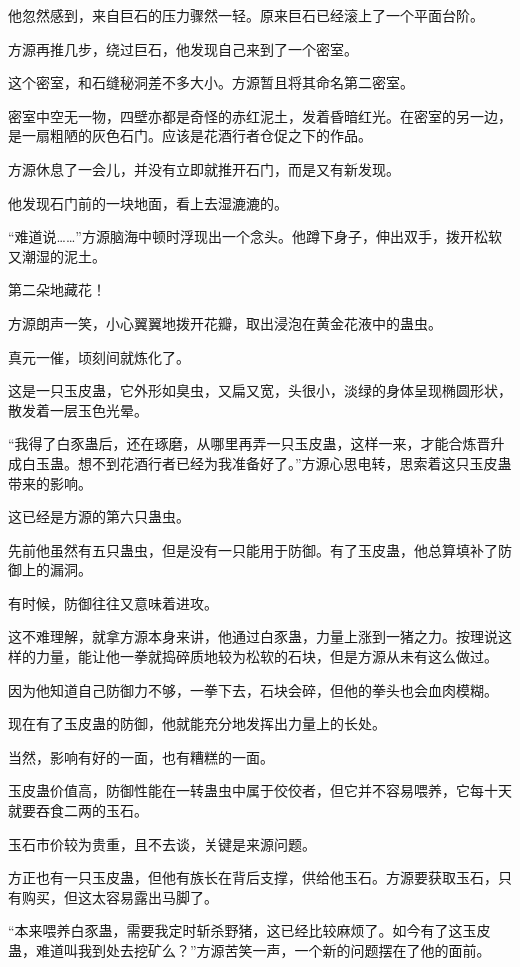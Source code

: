\begin{this_body}
他忽然感到，来自巨石的压力骤然一轻。原来巨石已经滚上了一个平面台阶。

方源再推几步，绕过巨石，他发现自己来到了一个密室。

这个密室，和石缝秘洞差不多大小。方源暂且将其命名第二密室。

密室中空无一物，四壁亦都是奇怪的赤红泥土，发着昏暗红光。在密室的另一边，是一扇粗陋的灰色石门。应该是花酒行者仓促之下的作品。

方源休息了一会儿，并没有立即就推开石门，而是又有新发现。

他发现石门前的一块地面，看上去湿漉漉的。

“难道说……”方源脑海中顿时浮现出一个念头。他蹲下身子，伸出双手，拨开松软又潮湿的泥土。

第二朵地藏花！

方源朗声一笑，小心翼翼地拨开花瓣，取出浸泡在黄金花液中的蛊虫。

真元一催，顷刻间就炼化了。

这是一只玉皮蛊，它外形如臭虫，又扁又宽，头很小，淡绿的身体呈现椭圆形状，散发着一层玉色光晕。

“我得了白豕蛊后，还在琢磨，从哪里再弄一只玉皮蛊，这样一来，才能合炼晋升成白玉蛊。想不到花酒行者已经为我准备好了。”方源心思电转，思索着这只玉皮蛊带来的影响。

这已经是方源的第六只蛊虫。

先前他虽然有五只蛊虫，但是没有一只能用于防御。有了玉皮蛊，他总算填补了防御上的漏洞。

有时候，防御往往又意味着进攻。

这不难理解，就拿方源本身来讲，他通过白豕蛊，力量上涨到一猪之力。按理说这样的力量，能让他一拳就捣碎质地较为松软的石块，但是方源从未有这么做过。

因为他知道自己防御力不够，一拳下去，石块会碎，但他的拳头也会血肉模糊。

现在有了玉皮蛊的防御，他就能充分地发挥出力量上的长处。

当然，影响有好的一面，也有糟糕的一面。

玉皮蛊价值高，防御性能在一转蛊虫中属于佼佼者，但它并不容易喂养，它每十天就要吞食二两的玉石。

玉石市价较为贵重，且不去谈，关键是来源问题。

方正也有一只玉皮蛊，但他有族长在背后支撑，供给他玉石。方源要获取玉石，只有购买，但这太容易露出马脚了。

“本来喂养白豕蛊，需要我定时斩杀野猪，这已经比较麻烦了。如今有了这玉皮蛊，难道叫我到处去挖矿么？”方源苦笑一声，一个新的问题摆在了他的面前。


\end{this_body}
